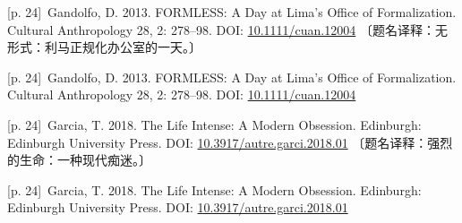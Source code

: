 \documentclass[10pt,a4paper]{article}
\begin{document}
\noindent\begin{minipage}{\textwidth}\begin{minipage}[t]{\dimexpr.5\textwidth-4mm\relax}\noindent\begin{minipage}[t]{\linewidth}{\scriptsize\color{gray} [p. 24]}\ Gandolfo, D. 2013. FORMLESS: A Day at Lima’s Office of Formalization. Cultural Anthropology 28, 2: 278–98. DOI: \url{10.1111/cuan.12004} 〔题名译释：无形式：利马正规化办公室的一天。〕\par\end{minipage}\par\end{minipage}\hfill\begin{minipage}[t]{\dimexpr.5\textwidth-4mm\relax}\noindent\begin{minipage}[t]{\linewidth}{\scriptsize\color{gray} [p. 24]}\ Gandolfo, D. 2013. FORMLESS: A Day at Lima’s Office of Formalization. Cultural Anthropology 28, 2: 278–98. DOI: \url{10.1111/cuan.12004}\par\end{minipage}\par\end{minipage}\end{minipage}\par
\noindent\begin{minipage}{\textwidth}\begin{minipage}[t]{\dimexpr.5\textwidth-4mm\relax}\noindent\begin{minipage}[t]{\linewidth}{\scriptsize\color{gray} [p. 24]}\ Garcia, T. 2018. The Life Intense: A Modern Obsession. Edinburgh: Edinburgh University Press. DOI: \url{10.3917/autre.garci.2018.01} 〔题名译释：强烈的生命：一种现代痴迷。〕\par\end{minipage}\par\end{minipage}\hfill\begin{minipage}[t]{\dimexpr.5\textwidth-4mm\relax}\noindent\begin{minipage}[t]{\linewidth}{\scriptsize\color{gray} [p. 24]}\ Garcia, T. 2018. The Life Intense: A Modern Obsession. Edinburgh: Edinburgh University Press. DOI: \url{10.3917/autre.garci.2018.01}\par\end{minipage}\par\end{minipage}\end{minipage}\par
\end{document}
